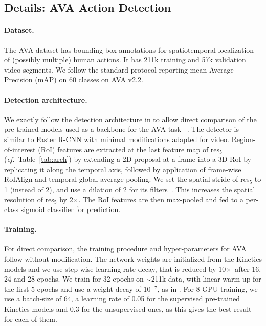 \documentclass[final]{cvpr}
\newcommand{\tblref}[1]{Table~\ref{#1}}
\newcommand{\app}{\raise.17ex\hbox{$\scriptstyle\sim$}}
\def\x{$\times$}
\begin{document}
\subsection{Details: AVA Action Detection}\label{sec:detection}


\paragraph{Dataset.}
The AVA dataset \cite{Gu2018} has bounding box annotations for spatiotemporal localization of (possibly multiple) human actions. It has 211k training and 57k validation video segments. We follow the standard protocol reporting mean Average Precision (mAP) on 60 classes \cite{Gu2018} on AVA v2.2.

\paragraph{Detection architecture.}
We exactly follow the detection architecture in \cite{Feichtenhofer19} to allow direct comparison of the pre-trained models used as a backbone for the AVA task~ \cite{Gu2018}.
The detector is similar to Faster R-CNN \cite{Ren16} with minimal modifications adapted for video. 
Region-of-interest (RoI) features \cite{Girshick15} are extracted at the last feature map of res$_5$ (\textit{cf.}~\tblref{tab:arch}) by extending a 2D proposal at a frame into a 3D RoI by replicating it along the temporal axis, followed by application of frame-wise RoIAlign \cite{He17}  and temporal global average pooling.
We set the spatial stride of res$_5$ to 1 (instead of 2), and use a dilation of 2 for its filters~\cite{Feichtenhofer19}. This increases the spatial resolution of res$_5$ by 2$\times$.
The RoI features are then max-pooled and fed to a per-class sigmoid classifier for prediction. 



\paragraph{Training.} For direct comparison, the training procedure and hyper-parameters for AVA follow \cite{Feichtenhofer19} without modification. 
The network weights are initialized from the Kinetics models and we use step-wise learning rate decay, that is reduced by 10\x~after 16, 24 and 28 epochs. 
We train for 32 epochs on $\app$211k data, with linear warm-up \cite{Goyal17} for the first 5 epochs and use a weight decay of 10$^{-7}$, as in \cite{Feichtenhofer19}. 
For 8 GPU training, we use a batch-size of 64, a learning rate of 0.05 for the supervised pre-trained Kinetics models and 0.3 for the unsupervised ones, as this gives the best result for each of them. 
\end{document}

